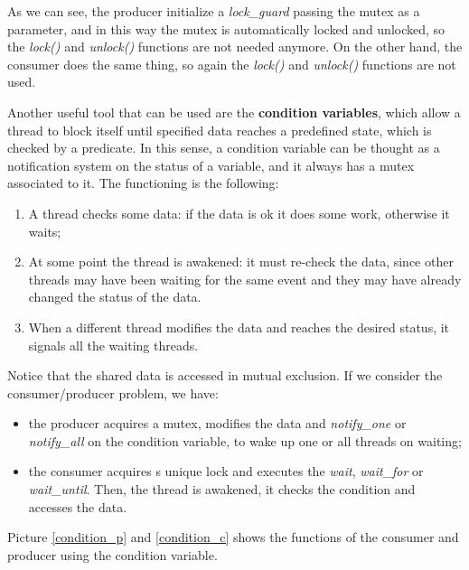 As we can see, the producer initialize a \textit{lock\_guard} passing the mutex as a parameter, and in this way the mutex is automatically locked and unlocked, so the \textit{lock()} and \textit{unlock()} functions are not needed anymore. On the other hand, the consumer does the same thing, so again the \textit{lock()} and \textit{unlock()} functions are not used.

Another useful tool that can be used are the \textbf{condition variables}, which allow a thread to block itself until specified data reaches a predefined state, which is checked by a predicate. In this sense, a condition variable can be thought as a notification system on the status of a variable, and it always has a mutex associated to it. The functioning is the following:

\begin{enumerate}
    \item A thread checks some data: if the data is ok it does some work, otherwise it waits;
    \item At some point the thread is awakened: it must re-check the data, since other threads may have been waiting for the same event and they may have already changed the status of the data.
    \item When a different thread modifies the data and reaches the desired status, it signals all the waiting threads.
\end{enumerate}

Notice that the shared data is accessed in mutual exclusion. If we consider the consumer/producer problem, we have:

\begin{itemize}
    \item the producer acquires a mutex, modifies the data and \textit{notify\_one} or \textit{notify\_all} on the condition variable, to wake up one or all threads on waiting;
    \item the consumer acquires s unique lock and executes the \textit{wait}, \textit{wait\_for} or \textit{wait\_until}. Then, the thread is awakened, it checks the condition and accesses the data.
\end{itemize}

Picture \ref{condition_p} and \ref{condition_c} shows the functions of the consumer and producer using the condition variable.

